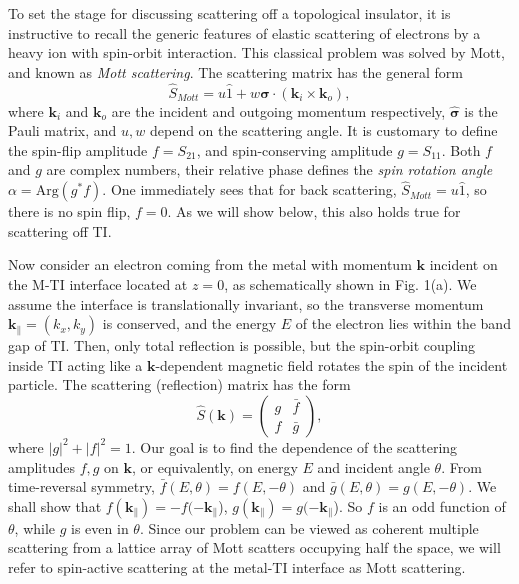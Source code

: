 \documentclass[11pt,revtex,aps]{report}
\def\v#1{\mathbf{#1}}
\begin{document}
To set the stage for discussing scattering off a topological insulator, it is instructive to recall the generic features of elastic scattering of electrons by a heavy ion with spin-orbit interaction. This classical problem was solved by Mott, and known as {\it Mott scattering}. 
The scattering matrix has the general form \cite{mott}
\[
\hat{S}_{Mott}=u\hat{1}+w\hat{{\boldsymbol{\sigma}}}\cdot (\mathbf{k}_{i}\times \mathbf{k}_{o}),
\]
where $\mathbf{k}_{i}$ and $\mathbf{k}_{o}$ are the incident and outgoing momentum respectively, $\hat{\boldsymbol{\sigma}}$ is the Pauli matrix, and $u,w$ depend on the scattering angle. It is customary to
define the spin-flip amplitude $f=S_{21}$, and spin-conserving amplitude $g=S_{11}$. 
Both $f$ and $g$ are complex numbers, their relative phase defines the {\it spin rotation angle} $\alpha=\mathrm{Arg}(g^*f)$.
One immediately sees that for back scattering, $\hat{S}_{Mott}=u\hat{1}$, so there is no spin flip, $f=0$. As we will show below, this also holds true for scattering off TI.

Now consider an electron coming from the metal 
with momentum $\v{k}$ incident on the M-TI interface located at $z=0$, 
as schematically shown in Fig. 1(a). 
We assume the interface is 
translationally invariant, so the transverse momentum $\v{k}_{\parallel}=(k_x,k_y)$ is 
conserved, and the energy $E$ of the electron 
lies within the band gap of TI. Then, only total reflection 
is possible, but the spin-orbit coupling inside TI acting like a $\v{k}$-dependent magnetic field rotates the spin of the incident particle. The scattering (reflection) matrix has the form
\[
\hat{S}(\v{k})=\left(
\begin{array}{ll}
  g & \bar{f}   \\
  f & \bar{g}
  \end{array}
\right),
\]
where $|g|^2+|f|^2=1$. 
Our goal is to find the dependence of the scattering amplitudes $f,g$ 
on $\v{k}$, or equivalently, on energy $E$ and 
incident angle $\theta$. From time-reversal symmetry, 
$\bar{f}(E,\theta)=f(E,-\theta)$ and $\bar{g}(E,\theta)=g(E,-\theta)$.
We shall show that
$f(\v{k}_{\parallel})=-f(-\v{k}_{\parallel}$),
$g(\v{k}_{\parallel})=g(-\v{k}_{\parallel}$). So 
$f$ is an odd function of $\theta$, while $g$ is even in $\theta$.  
Since our problem can be viewed as coherent multiple scattering from a lattice 
array of Mott scatters occupying half the space, we will refer to
spin-active scattering at the metal-TI interface as Mott scattering.
\end{document}
